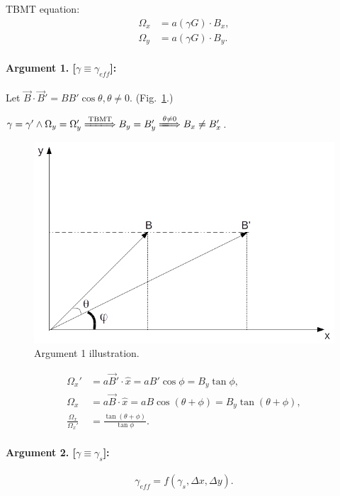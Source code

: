 \documentclass{article}
\newcommand{\Wx}{\Omega_x}
\newcommand{\Wy}{\Omega_y}
\newcommand{\yG}{\gamma G}
\newcommand{\Dx}{\Delta x}
\newcommand{\Dy}{\Delta y}
\begin{document}
	TBMT equation:
	\begin{align*}
		\Wx &= a(\yG)\cdot B_x,\\
		\Wy &= a(\yG)\cdot B_y.
	\end{align*}
	
	\paragraph{Argument 1. [$\gamma \equiv \gamma_{eff}$]:}
	Let $\vec{B}\cdot\vec{B}' = BB'\cos\theta, \theta\neq0$. (Fig.~\ref{fig:Arg1}.)
	
	$\gamma = \gamma' \land \Wy = \Wy' \xLongrightarrow{\text{TBMT}} B_y = B_y' \xLongrightarrow{\theta\neq0} B_x\neq B_x'$.
	
	\begin{figure}[h]\centering
			\includegraphics[scale=.5]{img/Field}
			\caption{Argument 1 illustration.\label{fig:Arg1}}
	\end{figure}
	
	\begin{align*}
		\Wx' &= a \vec{B}'\cdot\hat{x} = a B' \cos\phi = B_y \tan\phi,\\
		\Wx &= a \vec{B}\cdot\hat{x} = a B\cos(\theta+\phi) = B_y \tan(\theta+\phi),\\
		\frac{\Wx}{\Wx'} &= \frac{\tan(\theta+\phi)}{\tan\phi}.
	\end{align*}
	
	\paragraph{Argument 2. [$\gamma \equiv \gamma_s$]:}
	
	
	\[
		\gamma_{eff} = f(\gamma_s,\Dx,\Dy).
	\]
	
\end{document}
